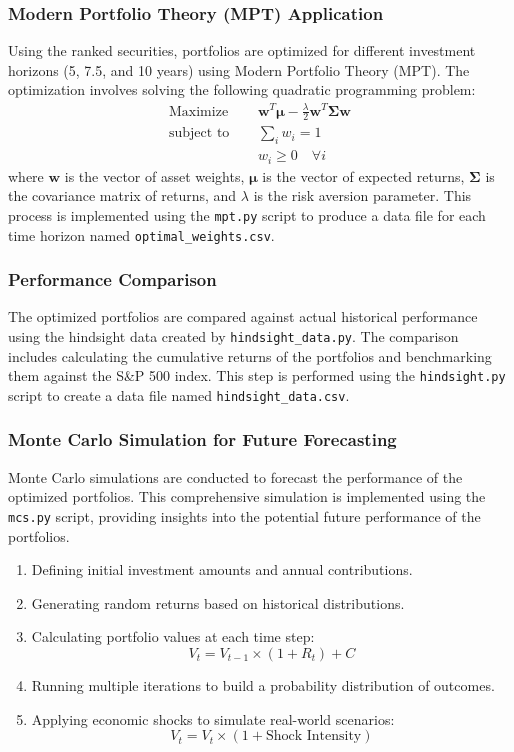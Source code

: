 \subsubsection{Modern Portfolio Theory (MPT) Application}
Using the ranked securities, portfolios are optimized for different investment horizons (5, 7.5, and 10 years) using Modern Portfolio Theory (MPT). The optimization involves solving the following quadratic programming problem:
\begin{align}
    \text{Maximize } & \quad \mathbf{w}^T \mathbf{\mu} - \frac{\lambda}{2} \mathbf{w}^T \mathbf{\Sigma} \mathbf{w} \\
    \text{subject to} & \quad \sum_{i} w_i = 1 \\
    & \quad w_i \geq 0 \quad \forall i
\end{align}
where \(\mathbf{w}\) is the vector of asset weights, \(\mathbf{\mu}\) is the vector of expected returns, \(\mathbf{\Sigma}\) is the covariance matrix of returns, and \(\lambda\) is the risk aversion parameter. This process is implemented using the \texttt{mpt.py} script to produce a data file for each time horizon named \texttt{optimal\_weights.csv}.

\subsubsection{Performance Comparison}
The optimized portfolios are compared against actual historical performance using the hindsight data created by \texttt{hindsight\_data.py}. The comparison includes calculating the cumulative returns of the portfolios and benchmarking them against the S\&P 500 index. This step is performed using the \texttt{hindsight.py} script to create a data file named \texttt{hindsight\_data.csv}.

\subsubsection{Monte Carlo Simulation for Future Forecasting}
Monte Carlo simulations are conducted to forecast the performance of the optimized portfolios. This comprehensive simulation is implemented using the \texttt{mcs.py} script, providing insights into the potential future performance of the portfolios.
\begin{enumerate}
    \item Defining initial investment amounts and annual contributions.
    \item Generating random returns based on historical distributions.
    \item Calculating portfolio values at each time step:
    \begin{equation}
        V_t = V_{t-1} \times (1 + R_t) + C
    \end{equation}
    \item Running multiple iterations to build a probability distribution of outcomes.
    \item Applying economic shocks to simulate real-world scenarios:
    \begin{equation}
        V_t = V_t \times (1 + \text{Shock Intensity})
    \end{equation}
\end{enumerate}

\newpage
